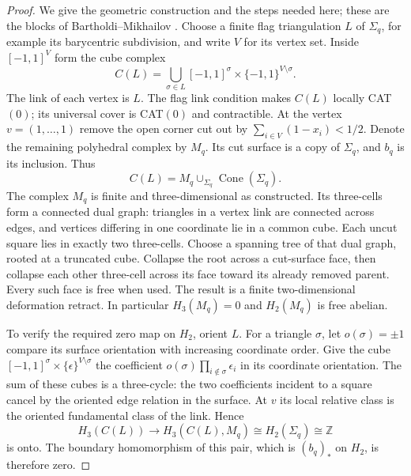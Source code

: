 \begin{proof}
We give the geometric construction and the steps needed here;
these are the blocks of Bartholdi--Mikhailov
\cite[\S6, Lemmas 6.1--6.2]{A_BartholdiMikhailov2026}.
Choose a finite flag triangulation $L$ of $\Sigma_q$, for example
its barycentric subdivision, and write $V$ for its vertex set.
Inside $[-1,1]^V$ form the cube complex
\[
 C(L)=\bigcup_{\sigma\in L}
       [-1,1]^\sigma\times\{-1,1\}^{V\setminus\sigma}.
\]
The link of each vertex is $L$. The flag link condition makes
$C(L)$ locally CAT$(0)$; its universal cover is CAT$(0)$ and
contractible. At the vertex $v=(1,\ldots,1)$ remove the open
corner cut out by $\sum_{i\in V}(1-x_i)<1/2$. Denote the
remaining polyhedral complex by $M_q$. Its cut surface is a
copy of $\Sigma_q$, and $b_q$ is its inclusion. Thus
\[
 C(L)=M_q\cup_{\Sigma_q}\operatorname{Cone}(\Sigma_q).
\]
The complex $M_q$ is finite and three-dimensional as constructed.
Its three-cells form a connected dual graph: triangles in a vertex
link are connected across edges, and vertices differing in one
coordinate lie in a common cube. Each uncut square lies in exactly
two three-cells. Choose a spanning tree of that dual graph, rooted
at a truncated cube. Collapse the root across a cut-surface face,
then collapse each other three-cell across its face toward its
already removed parent. Every such face is free when used.
The result is a finite two-dimensional deformation retract.
In particular $H_3(M_q)=0$ and $H_2(M_q)$ is free abelian.

To verify the required zero map on $H_2$, orient $L$. For a
triangle $\sigma$, let $o(\sigma)=\pm1$ compare its surface
orientation with increasing coordinate order. Give the cube
$[-1,1]^\sigma\times\{\epsilon\}^{V\setminus\sigma}$ the
coefficient $o(\sigma)\prod_{i\notin\sigma}\epsilon_i$ in
its coordinate orientation. The sum of these cubes is a
three-cycle: the two coefficients incident to a square cancel
by the oriented edge relation in the surface. At $v$ its local
relative class is the oriented fundamental class of the link.
Hence
\[
 H_3(C(L))\longrightarrow H_3(C(L),M_q)
       \cong H_2(\Sigma_q)\cong\mathbb Z
\]
is onto. The boundary homomorphism of this pair, which is
$(b_q)_*$ on $H_2$, is therefore zero.


\end{proof}
